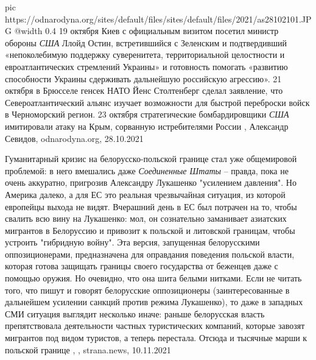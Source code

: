 \ifcmt
  pic https://odnarodyna.org/sites/default/files/sites/default/files/2021/as28102101.JPG
  @width 0.4
\fi
19 октября Киев с официальным визитом посетил министр обороны \emph{США} Ллойд Остин,
встретившийся с Зеленским и подтвердивший «непоколебимую поддержку
суверенитета, территориальной целостности и евроатлантических стремлений
Украины» и готовность помогать «развитию способности Украины сдерживать
дальнейшую российскую агрессию».  21 октября в Брюсселе генсек НАТО Йенс
Столтенберг сделал заявление, что Североатлантический альянс изучает
возможности для быстрой переброски войск в Черноморский регион.  23 октября
стратегические бомбардировщики \emph{США} имитировали атаку на Крым, сорванную
истребителями России
, 
Александр Севидов, odnarodyna.org, 28.10.2021

Гуманитарный кризис на белорусско-польской границе стал уже общемировой
проблемой: в него вмешались даже \emph{Соединенные Штаты} – правда, пока не очень
аккуратно, пригрозив Александру Лукашенко "усилением давления". Но Америка
далеко, а для ЕС это реальная чрезвычайная ситуация, из которой европейцы
выхода не видят.  Вчерашний день в ЕС был потрачен на то, чтобы свалить всю
вину на Лукашенко: мол, он сознательно заманивает азиатских мигрантов в
Белоруссию и привозит к польской и литовской границам, чтобы устроить
"гибридную войну". Эта версия, запущенная белорусскими оппозиционерами,
предназначена для оправдания поведения польской власти, которая готова защищать
границы своего государства от беженцев даже с помощью оружия.  Но очевидно, что
она шита белыми нитками. Если не читать того, что пишут и говорят белорусские
оппозиционеры (заинтересованные в дальнейшем усилении санкций против режима
Лукашенко), то даже в западных СМИ ситуация выглядит несколько иначе: раньше
белорусская власть препятствовала деятельности частных туристических компаний,
которые завозят мигрантов под видом туристов, а теперь перестала. Отсюда и
тысячные марши к польской границе
, 
, strana.news, 10.11.2021
